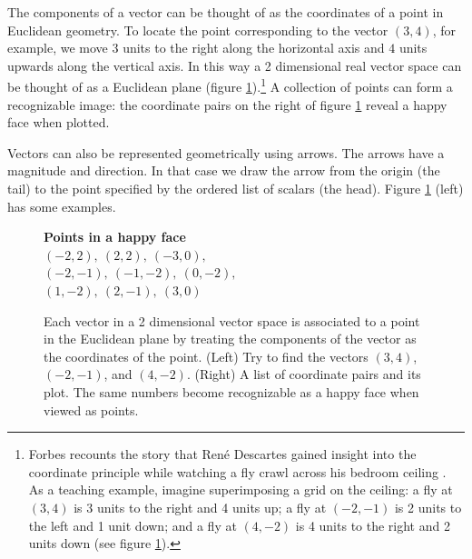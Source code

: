 The components of a vector can be thought of as the coordinates of a point in Euclidean geometry. To locate the point corresponding to the vector $(3,4)$, for example, we move $3$ units to the right along the horizontal axis and $4$ units upwards along the vertical axis. In this way a 2 dimensional real vector space can be thought of as a Euclidean plane (figure \ref{abridged_euclidean_plane}).\footnote{Forbes recounts the story that Ren{\'e} Descartes gained insight into the coordinate principle while watching a fly crawl across his bedroom ceiling \cite[p.~143]{forbes1977descartes}. As a teaching example, imagine superimposing a grid on the ceiling: a fly at $(3,4)$ is 3 units to the right and 4 units up; a fly at $(-2,-1)$ is 2 units to the left and 1 unit down; and a fly at $(4,-2)$ is 4 units to the right and 2 units down (see figure \ref{abridged_euclidean_plane}).} A collection of points can form a recognizable image: the coordinate pairs on the right of figure \ref{abridged_euclidean_plane} reveal a happy face when plotted.

Vectors can also be represented geometrically using arrows. The arrows have a magnitude and direction. In that case we draw the arrow from the origin (the tail) to the point specified by the ordered list of scalars (the head). Figure \ref{abridged_euclidean_plane} (left) has some examples.

\begin{figure}[htbp]
\centering
\begin{minipage}[c]{.39\textwidth}
\centering
{}
\end{minipage}
\hspace{.04\textwidth}
\begin{minipage}[c]{.44\textwidth}
\centering
\textbf{Points in a happy face}\\[3pt]
{\small
$(-2,2),\ (2,2),\ (-3,0),$\\
$(-2,-1),\ (-1,-2),\ (0,-2),$\\
$(1,-2),\ (2,-1),\ (3,0)$
}\\[6pt]
\end{minipage}
\caption[Left: Scott Hotton. Right: coordinate plot created for this abridgment.]{Each vector in a 2 dimensional vector space is associated to a point in the Euclidean plane by treating the components of the vector as the coordinates of the point. (Left) Try to find the vectors $(3,4)$, $(-2,-1)$, and $(4,-2)$. (Right) A list of coordinate pairs and its plot. The same numbers become recognizable as a happy face when viewed as points.}
\label{abridged_euclidean_plane}
\end{figure}

